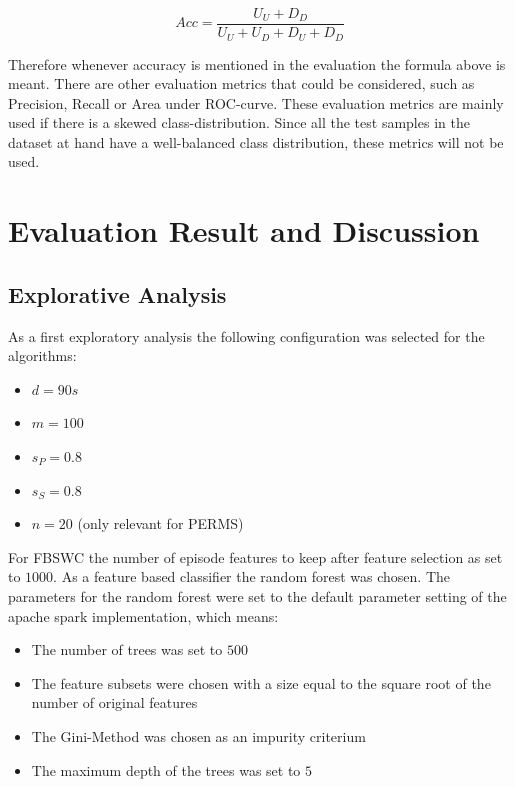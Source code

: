 \[ Acc = \frac{U_U + D_D}{U_U +U_D +D_U+D_D}\]

Therefore whenever accuracy  is mentioned in the evaluation the formula above is meant. There are other evaluation metrics that could be considered, such as Precision, Recall or Area under ROC-curve. These evaluation metrics are mainly used if there is a skewed class-distribution. Since all the test samples in the dataset at hand have a well-balanced class distribution, these metrics will not be used.



\section{Evaluation Result and Discussion}
\label{sec_evaluationResults}

\subsection{Explorative Analysis}
\label{subsec_explorativeAnalysis}

As a first exploratory analysis the following configuration was selected for the algorithms:

\begin{itemize}
	\item $d = 90s$
	\item $m = 100$ 
	\item $s_P = 0.8$
	\item $s_S = 0.8$
	\item $n = 20$ (only relevant for PERMS)
\end{itemize}

For FBSWC the number of episode features to keep after feature selection as set to $1000$. As a feature based classifier the random forest was chosen. The parameters for the random forest were set to the default parameter setting of the apache spark implementation, which means:

\begin{itemize}
	\item The number of trees was set to $500$
	\item The feature subsets were chosen with a size equal to the square root of the number of original features
	\item The Gini-Method was chosen as an impurity criterium
	\item The maximum depth of the trees was set to $5$
\end{itemize}

